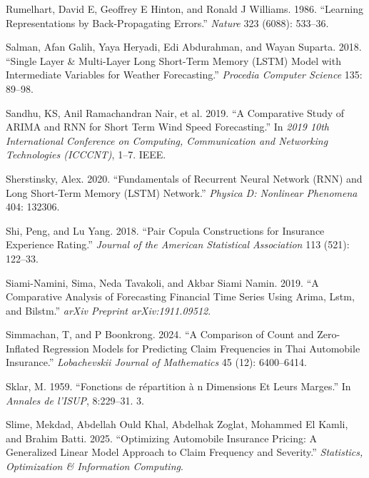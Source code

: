 \documentclass[
  letterpaper,
  double,
  12pt,
  1.0in]{beavtex}
\newlength{\cslhangindent}
\newenvironment{CSLReferences}[2] %
 {\begin{list}{}{%
  \setlength{\itemindent}{0pt}
  \setlength{\leftmargin}{0pt}
  \setlength{\parsep}{0pt}
  \ifodd #1
   \setlength{\leftmargin}{\cslhangindent}
   \setlength{\itemindent}{-1\cslhangindent}
  \fi
  \setlength{\itemsep}{#2\baselineskip}}}
 {\end{list}}
\begin{document}
\begin{CSLReferences}{1}{0}
Rumelhart, David E, Geoffrey E Hinton, and Ronald J Williams. 1986.
{``Learning Representations by Back-Propagating Errors.''} \emph{Nature}
323 (6088): 533--36.

Salman, Afan Galih, Yaya Heryadi, Edi Abdurahman, and Wayan Suparta.
2018. {``Single Layer \& Multi-Layer Long Short-Term Memory (LSTM) Model
with Intermediate Variables for Weather Forecasting.''} \emph{Procedia
Computer Science} 135: 89--98.

Sandhu, KS, Anil Ramachandran Nair, et al. 2019. {``A Comparative Study
of ARIMA and RNN for Short Term Wind Speed Forecasting.''} In \emph{2019
10th International Conference on Computing, Communication and Networking
Technologies (ICCCNT)}, 1--7. IEEE.

Sherstinsky, Alex. 2020. {``Fundamentals of Recurrent Neural Network
(RNN) and Long Short-Term Memory (LSTM) Network.''} \emph{Physica D:
Nonlinear Phenomena} 404: 132306.

Shi, Peng, and Lu Yang. 2018. {``Pair Copula Constructions for Insurance
Experience Rating.''} \emph{Journal of the American Statistical
Association} 113 (521): 122--33.

Siami-Namini, Sima, Neda Tavakoli, and Akbar Siami Namin. 2019. {``A
Comparative Analysis of Forecasting Financial Time Series Using Arima,
Lstm, and Bilstm.''} \emph{arXiv Preprint arXiv:1911.09512}.

Simmachan, T, and P Boonkrong. 2024. {``A Comparison of Count and
Zero-Inflated Regression Models for Predicting Claim Frequencies in Thai
Automobile Insurance.''} \emph{Lobachevskii Journal of Mathematics} 45
(12): 6400--6414.

Sklar, M. 1959. {``Fonctions de r{é}partition {à} n Dimensions Et Leurs
Marges.''} In \emph{Annales de l'ISUP}, 8:229--31. 3.

Slime, Mekdad, Abdellah Ould Khal, Abdelhak Zoglat, Mohammed El Kamli,
and Brahim Batti. 2025. {``Optimizing Automobile Insurance Pricing: A
Generalized Linear Model Approach to Claim Frequency and Severity.''}
\emph{Statistics, Optimization \& Information Computing}.


\end{CSLReferences}
\end{document}
